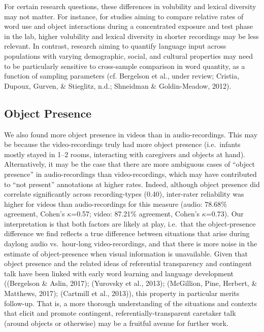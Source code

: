 \documentclass[floatsintext,man]{apa6}
\theoremstyle{definition}
\theoremstyle{definition}
\theoremstyle{definition}
\theoremstyle{remark}
\begin{document}
For certain research questions, these differences in volubility and
lexical diversity may not matter. For instance, for studies aiming to
compare relative rates of word use and object interactions during a
concentrated exposure and test phase in the lab, higher volubility and
lexical diversity in shorter recordings may be less relevant. In
contrast, research aiming to quantify language input across populations
with varying demographic, social, and cultural properties may need to be
particularly sensitive to cross-sample comparison in word quantity, as a
function of sampling parameters (cf. Bergelson et al., under review;
Cristia, Dupoux, Gurven, \& Stieglitz, n.d.; Shneidman \& Goldin-Meadow,
2012).

\hypertarget{object-presence}{%
\subsection{Object Presence}\label{object-presence}}

We also found more object presence in videos than in audio-recordings.
This may be because the video-recordings truly had more object presence
(i.e.~infants mostly stayed in 1--2 rooms, interacting with caregivers
and objects at hand). Alternatively, it may be the case that there are
more ambiguous cases of \enquote{object presence} in audio-recordings
than video-recordings, which may have contributed to \enquote{not
present} annotations at higher rates. Indeed, although object presence
did correlate significantly across recording-types (0.40), inter-rater
reliability was higher for videos than audio-recordings for this measure
(audio: 78.68\% agreement, Cohen's \(\kappa\)=0.57; video: 87.21\%
agreement, Cohen's \(\kappa\)=0.73). Our interpretation is that both
factors are likely at play, i.e.~that the object-presence difference we
find reflects a true difference between situations that arise during
daylong audio vs.~hour-long video-recordings, and that there is more
noise in the estimate of object-presence when visual information is
unavailable. Given that object presence and the related ideas of
referential transparency and contingent talk have been linked with early
word learning and language development ((Bergelson \& Aslin, 2017);
(Yurovsky et al., 2013); (McGillion, Pine, Herbert, \& Matthews, 2017);
(Cartmill et al., 2013)), this property in particular merits follow-up.
That is, a more thorough understanding of the situations and contexts
that elicit and promote contingent, referentially-transparent caretaker
talk (around objects or otherwise) may be a fruitful avenue for further
work.
\end{document}
